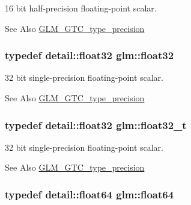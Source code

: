 16 bit half-\/precision floating-\/point scalar. 

\begin{DoxySeeAlso}{See Also}
\hyperlink{group__gtc__type__precision}{G\-L\-M\-\_\-\-G\-T\-C\-\_\-type\-\_\-precision} 
\end{DoxySeeAlso}
\hypertarget{group__gtc__type__precision_ga814f2f65354b6588b067cc5c67a6b340}{
\subsubsection[{float32}]{\setlength{\rightskip}{0pt plus 5cm}typedef detail\-::float32 {\bf glm\-::float32}}}\label{group__gtc__type__precision_ga814f2f65354b6588b067cc5c67a6b340}


32 bit single-\/precision floating-\/point scalar. 

\begin{DoxySeeAlso}{See Also}
\hyperlink{group__gtc__type__precision}{G\-L\-M\-\_\-\-G\-T\-C\-\_\-type\-\_\-precision} 
\end{DoxySeeAlso}
\hypertarget{group__gtc__type__precision_ga642737ae3e7c434b366f2191e6944bf2}{
\subsubsection[{float32\-\_\-t}]{\setlength{\rightskip}{0pt plus 5cm}typedef detail\-::float32 {\bf glm\-::float32\-\_\-t}}}\label{group__gtc__type__precision_ga642737ae3e7c434b366f2191e6944bf2}


32 bit single-\/precision floating-\/point scalar. 

\begin{DoxySeeAlso}{See Also}
\hyperlink{group__gtc__type__precision}{G\-L\-M\-\_\-\-G\-T\-C\-\_\-type\-\_\-precision} 
\end{DoxySeeAlso}
\hypertarget{group__gtc__type__precision_gab721f828b41f46b20cf4883b50733d3b}{
\subsubsection[{float64}]{\setlength{\rightskip}{0pt plus 5cm}typedef detail\-::float64 {\bf glm\-::float64}}}\label{group__gtc__type__precision_gab721f828b41f46b20cf4883b50733d3b}


